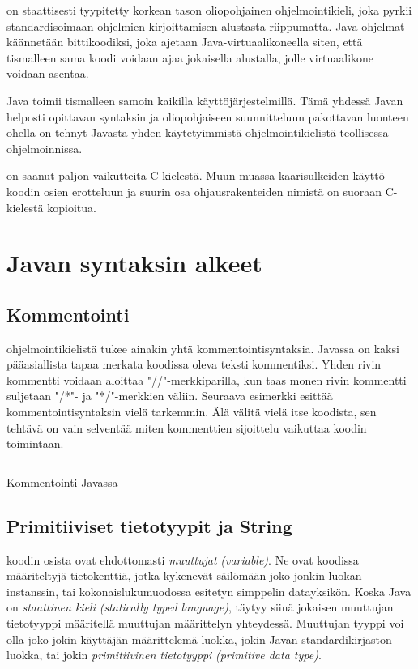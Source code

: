 \documentclass{tufte-book}
\newcommand{\eng}[1]{\textit{(#1)}}
\newcommand{\new}[1]{\textit{\gls{#1}}}
\newcommand{\neweng}[2]{\new{#1} \eng{#2}}
\newcommand{\code}[3]{
\begin{listing}
    \inputminted{java}{OhjelmointiopasEsimerkit/src/#1/#2.java}
    \caption{#3}
    \label{Java-#1-#2}
\end{listing}
}
\begin{document}
 on staattisesti tyypitetty korkean tason oliopohjainen ohjelmointikieli, joka
pyrkii standardisoimaan ohjelmien kirjoittamisen alustasta riippumatta. Java-ohjelmat käännetään
bittikoodiksi, joka ajetaan Java-virtuaalikoneella siten, että tismalleen sama koodi voidaan ajaa
jokaisella alustalla, jolle virtuaalikone voidaan asentaa.

 Java toimii tismalleen samoin kaikilla käyttöjärjestelmillä. Tämä
yhdessä Javan helposti opittavan syntaksin ja oliopohjaiseen suunnitteluun pakottavan luonteen
ohella on tehnyt Javasta yhden käytetyimmistä ohjelmointikielistä teollisessa ohjelmoinnissa.

 on saanut paljon vaikutteita C-kielestä. Muun muassa kaarisulkeiden
käyttö koodin osien erotteluun ja suurin osa ohjausrakenteiden nimistä on suoraan C-kielestä
kopioitua.


\section{Javan syntaksin alkeet}
\label{syntaksin alkeista}

\subsection{Kommentointi}
\label{kommentointi}

 ohjelmointikielistä tukee ainakin yhtä kommentointisyntaksia. Javassa on
kaksi pääasiallista tapaa merkata koodissa oleva teksti kommentiksi. Yhden rivin kommentti voidaan
aloittaa "//"-merkkiparilla, kun taas monen rivin kommentti suljetaan "/*"- ja "*/"-merkkien
väliin. Seuraava esimerkki esittää kommentointisyntaksin vielä tarkemmin. Älä välitä vielä itse
koodista, sen tehtävä on vain selventää miten kommenttien sijoittelu vaikuttaa koodin toimintaan.

\code{week2/basicexamples}{Commenting}{Kommentointi Javassa}

\subsection{Primitiiviset tietotyypit ja String}
\label{tietotyypit}

 koodin osista ovat ehdottomasti \textit{\gls{muuttuja}t}
\eng{variable}. Ne ovat koodissa määriteltyjä tietokenttiä, jotka kykenevät säilömään joko jonkin
luokan instanssin, tai kokonaislukumuodossa esitetyn simppelin datayksikön. Koska Java on 
\neweng{staattinen kieli}{statically typed language}, täytyy siinä jokaisen muuttujan tietotyyppi
määritellä muuttujan määrittelyn yhteydessä. Muuttujan tyyppi voi olla joko jokin käyttäjän
määrittelemä luokka, jokin Javan standardikirjaston luokka, tai jokin \neweng{primitiivinen
tietotyyppi}{primitive data type}.
\end{document}
